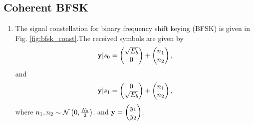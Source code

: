 \documentclass[10pt, a4paper]{article}
\begin{document}
\subsection{Coherent BFSK}
\begin{enumerate}
\item
The signal constellation for binary frequency shift keying (BFSK) is given in Fig. \ref{fig:bfsk_const}.The received symbols are given by 
\begin{align}
\mathbf{y}|s_0 = 
\begin{pmatrix}
\sqrt{E_b} \\
0
\end{pmatrix}
+
\begin{pmatrix}
 n_{1}\\
n_{2}
\end{pmatrix},
\end{align}
and 
\begin{align}
\mathbf{y}|s_1 = 
\begin{pmatrix}
0\\
\sqrt{E_b} 
\end{pmatrix}
+
\begin{pmatrix}
n_{1}\\
 n_{2}
\end{pmatrix},
\end{align}
where $n_1,n_2 \sim \mathcal{N}\left(0,\frac{N_0}{2}\right)$. and
$
\mathbf{y} = 
\begin{pmatrix}
y_{1}\\
 y_{2}
\end{pmatrix}
$.


\end{enumerate}
\end{document}
